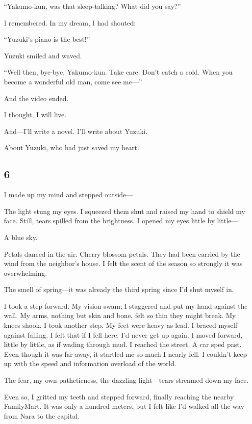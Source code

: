 \documentclass[
    a4paper,
    12pt,
    twoside,
    openany,
    UTF8,
    fontset=windows
]{ctexbook}
\begin{document}
``Yakumo-kun, was that sleep-talking? What did you say?''

I remembered. In my dream, I had shouted:

``Yuzuki's piano is the best!''

Yuzuki smiled and waved.

``Well then, bye-bye, Yakumo-kun. Take care. Don't catch a cold. When you become a wonderful old man, come see me---''

And the video ended.

I thought, I will live.

And---I'll write a novel. I'll write about Yuzuki.

About Yuzuki, who had just saved my heart.


\subsection*{6}

I made up my mind and stepped outside---

The light stung my eyes. I squeezed them shut and raised my hand to shield my face. Still, tears spilled from the brightness. I opened my eyes little by little---

A blue sky.

Petals danced in the air. Cherry blossom petals. They had been carried by the wind from the neighbor's house. I felt the scent of the season so strongly it was overwhelming.

The smell of spring---it was already the third spring since I'd shut myself in.

I took a step forward. My vision swam; I staggered and put my hand against the wall. My arms, nothing but skin and bone, felt so thin they might break. My knees shook. I took another step. My feet were heavy as lead. I braced myself against falling. I felt that if I fell here, I'd never get up again. I moved forward, little by little, as if wading through mud. I reached the street. A car sped past. Even though it was far away, it startled me so much I nearly fell. I couldn't keep up with the speed and information overload of the world.

The fear, my own patheticness, the dazzling light---tears streamed down my face.

Even so, I gritted my teeth and stepped forward, finally reaching the nearby FamilyMart. It was only a hundred meters, but I felt like I'd walked all the way from Nara to the capital.
\end{document}
